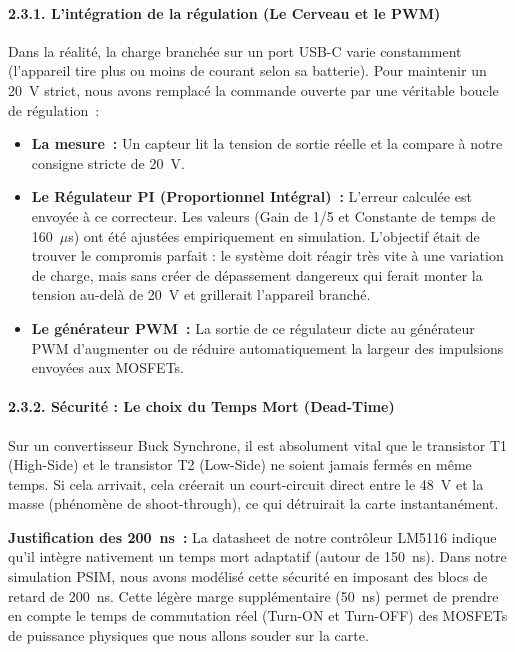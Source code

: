 \paragraph{2.3.1. L'intégration de la régulation (Le Cerveau et le PWM)}
Dans la réalité, la charge branchée sur un port USB-C varie constamment (l'appareil tire plus ou moins de courant selon sa batterie). Pour maintenir un 20~V strict, nous avons remplacé la commande ouverte par une véritable boucle de régulation~:
\begin{itemize}
    \item \textbf{La mesure~:} Un capteur lit la tension de sortie réelle et la compare à notre consigne stricte de 20~V.
    \item \textbf{Le Régulateur PI (Proportionnel Intégral)~:} L'erreur calculée est envoyée à ce correcteur. Les valeurs (Gain de 1/5 et Constante de temps de 160~$\mu$s) ont été ajustées empiriquement en simulation. L'objectif était de trouver le compromis parfait : le système doit réagir très vite à une variation de charge, mais sans créer de dépassement dangereux qui ferait monter la tension au-delà de 20~V et grillerait l'appareil branché.
    \item \textbf{Le générateur PWM~:} La sortie de ce régulateur dicte au générateur PWM d'augmenter ou de réduire automatiquement la largeur des impulsions envoyées aux MOSFETs.
\end{itemize}

\paragraph{2.3.2. Sécurité : Le choix du Temps Mort (Dead-Time)}
Sur un convertisseur Buck Synchrone, il est absolument vital que le transistor T1 (High-Side) et le transistor T2 (Low-Side) ne soient jamais fermés en même temps. Si cela arrivait, cela créerait un court-circuit direct entre le 48~V et la masse (phénomène de shoot-through), ce qui détruirait la carte instantanément.

\textbf{Justification des 200~ns~:} La datasheet de notre contrôleur LM5116 indique qu'il intègre nativement un temps mort adaptatif (autour de 150~ns). Dans notre simulation PSIM, nous avons modélisé cette sécurité en imposant des blocs de retard de 200~ns. Cette légère marge supplémentaire (50~ns) permet de prendre en compte le temps de commutation réel (Turn-ON et Turn-OFF) des MOSFETs de puissance physiques que nous allons souder sur la carte.

